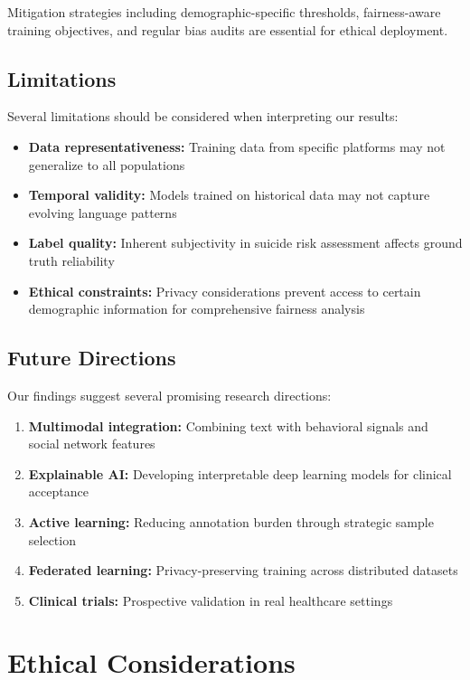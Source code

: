 \documentclass[conference]{IEEEtran}
\begin{document}
Mitigation strategies including demographic-specific thresholds, fairness-aware training objectives, and regular bias audits are essential for ethical deployment.

\subsection{Limitations}

Several limitations should be considered when interpreting our results:

\begin{itemize}
    \item \textbf{Data representativeness:} Training data from specific platforms may not generalize to all populations
    \item \textbf{Temporal validity:} Models trained on historical data may not capture evolving language patterns
    \item \textbf{Label quality:} Inherent subjectivity in suicide risk assessment affects ground truth reliability
    \item \textbf{Ethical constraints:} Privacy considerations prevent access to certain demographic information for comprehensive fairness analysis
\end{itemize}

\subsection{Future Directions}

Our findings suggest several promising research directions:

\begin{enumerate}
    \item \textbf{Multimodal integration:} Combining text with behavioral signals and social network features
    \item \textbf{Explainable AI:} Developing interpretable deep learning models for clinical acceptance
    \item \textbf{Active learning:} Reducing annotation burden through strategic sample selection
    \item \textbf{Federated learning:} Privacy-preserving training across distributed datasets
    \item \textbf{Clinical trials:} Prospective validation in real healthcare settings
\end{enumerate}

\section{Ethical Considerations}
\end{document}

